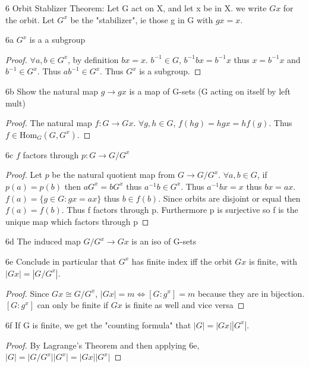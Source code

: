 \documentclass{article}
\newcommand{\abs}[1]{\lvert #1\rvert}
\newcommand{\Hom}[0]{\text{Hom}}
\begin{document}
\begin{PROB}{6}\label{Problem 6.}
    Orbit Stablizer Theorem: Let G act on X, and let x be in X. we write $Gx$ for the orbit. Let $G^x$ be the "stabilizer", ie those g in G with $gx=x$.
\end{PROB}
\begin{claim}{6a}
    $G^x$ is a a subgroup
\end{claim}
\begin{proof}
    $\forall a, b \in G^x$, by definition $bx = x$. $b^{-1} \in G$, $b^{-1}bx = b^{-1}x$ thus $x = b^{-1}x$ and $b^{-1} \in G^x$. Thus $ab^{-1} \in G^x$. Thus $G^x$ is a subgroup. 
\end{proof}
\begin{claim}{6b}
    Show the natural map $g \to gx$ is a map of G-sets (G acting on itself by left mult)
\end{claim}
\begin{proof}
    The natural map $f: G \to Gx$. $\forall g, h \in G$, $f(hg) = hgx = hf(g)$. Thus $f \in \Hom_G(G, G^x)$.
\end{proof}
\begin{claim}{6c}
    $f$ factors through $p: G \to G/G^x$
\end{claim}
\begin{proof}
    Let $p$ be the natural quotient map from $G \to G/G^x$. $\forall a, b \in G$, if $p(a) = p(b)$ then $aG^x = bG^x$ thus $a^{-1}b \in G^x$. Thus $a^{-1}b x = x$ thus $bx = ax$. $f(a) = \{g \in G : gx = ax\}$ thus $b \in f(b)$. Since orbits are disjoint or equal then $f(a) = f(b)$. Thus f factors through p. Furthermore p is surjective so f is the unique map which factors through p
\end{proof}
\begin{claim}{6d}
    The induced map $G/G^x \to Gx$ is an iso of G-sets
\end{claim}
\begin{claim}{6e}
    Conclude in particular that $G^x$ has finite index iff the orbit $Gx$ is finite, with $|Gx| = |G/G^x|$.
\end{claim}
\begin{proof}
    Since $Gx \cong G/G^x$, $|Gx| = m \iff [G: g^x] = m$ because they are in bijection. $[G: g^x]$ can only be finite if $Gx$ is finite as well and vice versa
\end{proof}
\begin{claim}{6f}
    If G is finite, we get the "counting formula" that $|G| = |Gx||G^x|$. 
\end{claim}
\begin{proof}
    By Lagrange's Theorem and then applying 6e, $\abs{G} = \abs{G/G^x}\abs{G^x} = \abs{Gx}\abs{G^x}$
\end{proof}
\end{document}
